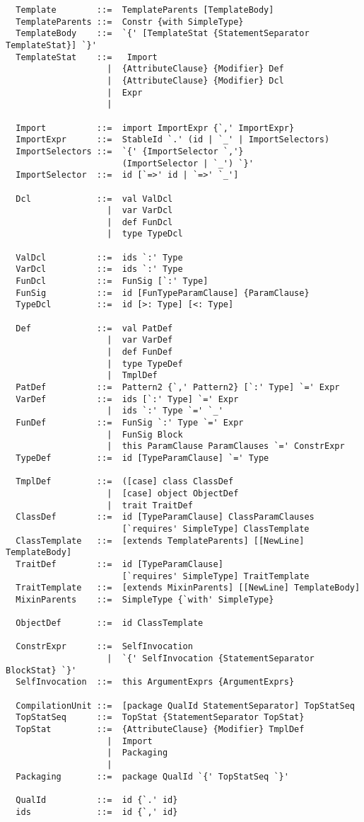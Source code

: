 \begin{lstlisting}
  Template        ::=  TemplateParents [TemplateBody]
  TemplateParents ::=  Constr {with SimpleType}
  TemplateBody    ::=  `{' [TemplateStat {StatementSeparator TemplateStat}] `}'
  TemplateStat    ::=   Import
                    |  {AttributeClause} {Modifier} Def
                    |  {AttributeClause} {Modifier} Dcl
                    |  Expr
                    |

  Import          ::=  import ImportExpr {`,' ImportExpr}
  ImportExpr      ::=  StableId `.' (id | `_' | ImportSelectors)
  ImportSelectors ::=  `{' {ImportSelector `,'} 
                       (ImportSelector | `_') `}'
  ImportSelector  ::=  id [`=>' id | `=>' `_']

  Dcl             ::=  val ValDcl
                    |  var VarDcl
                    |  def FunDcl
                    |  type TypeDcl

  ValDcl          ::=  ids `:' Type
  VarDcl          ::=  ids `:' Type
  FunDcl          ::=  FunSig [`:' Type]
  FunSig          ::=  id [FunTypeParamClause] {ParamClause}
  TypeDcl         ::=  id [>: Type] [<: Type]

  Def             ::=  val PatDef
                    |  var VarDef
                    |  def FunDef
                    |  type TypeDef
                    |  TmplDef
  PatDef          ::=  Pattern2 {`,' Pattern2} [`:' Type] `=' Expr
  VarDef          ::=  ids [`:' Type] `=' Expr
                    |  ids `:' Type `=' `_'
  FunDef          ::=  FunSig `:' Type `=' Expr
                    |  FunSig Block
                    |  this ParamClause ParamClauses `=' ConstrExpr
  TypeDef         ::=  id [TypeParamClause] `=' Type

  TmplDef         ::=  ([case] class ClassDef
                    |  [case] object ObjectDef
                    |  trait TraitDef
  ClassDef        ::=  id [TypeParamClause] ClassParamClauses 
                       [`requires' SimpleType] ClassTemplate 
  ClassTemplate   ::=  [extends TemplateParents] [[NewLine] TemplateBody]
  TraitDef        ::=  id [TypeParamClause]
                       [`requires' SimpleType] TraitTemplate
  TraitTemplate   ::=  [extends MixinParents] [[NewLine] TemplateBody]
  MixinParents    ::=  SimpleType {`with' SimpleType}
  
  ObjectDef       ::=  id ClassTemplate

  ConstrExpr      ::=  SelfInvocation
                    |  `{' SelfInvocation {StatementSeparator BlockStat} `}'
  SelfInvocation  ::=  this ArgumentExprs {ArgumentExprs}

  CompilationUnit ::=  [package QualId StatementSeparator] TopStatSeq
  TopStatSeq      ::=  TopStat {StatementSeparator TopStat}
  TopStat         ::=  {AttributeClause} {Modifier} TmplDef
                    |  Import
                    |  Packaging
                    |
  Packaging       ::=  package QualId `{' TopStatSeq `}'

  QualId          ::=  id {`.' id}
  ids             ::=  id {`,' id}
\end{lstlisting}

